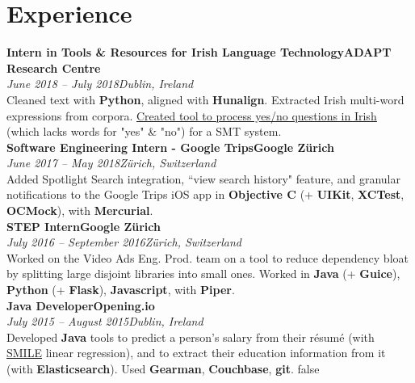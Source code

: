 \documentclass[a4paper, oneside, final]{scrartcl}
\newcommand{\nasc}[2]{\href{#1}{\color{blue}\setulcolor{blue}\ul{#2}}}
\newcommand{\bearna}[0]{\vspace{2.25mm}\\}
\newcommand{\fmtdate}[1]{\textit{#1}}
\newcommand{\fmtaddress}[1]{\textit{#1}}
\newcommand{\fmtjobtitle}[1]{\textbf{#1}}
\newcommand{\fmtskill}[1]{\textbf{#1}}
\begin{document}
\section{Experience}
\fmtjobtitle{Intern in Tools \& Resources for Irish Language Technology\hfill ADAPT Research Centre}\\
\fmtdate{June 2018 -- July 2018}\hfill\fmtaddress{Dublin, Ireland}\\
Cleaned text with \fmtskill{Python}, aligned with \fmtskill{Hunalign}. Extracted Irish multi-word expressions from corpora. \nasc{http://mycode.doesnot.run/2018/08/15/yes-no/}{Created tool to process yes/no questions in Irish} (which lacks words for "yes" \& "no") for a SMT system.
\bearna
\fmtjobtitle{Software Engineering Intern - Google Trips\hfill Google Zürich}\\
\fmtdate{June 2017 -- May 2018}\hfill\fmtaddress{Zürich, Switzerland}\\
Added Spotlight Search integration, ``view search history" feature, and granular notifications to the Google Trips iOS app in \fmtskill{Objective C} (+ \fmtskill{UIKit}, \fmtskill{XCTest}, \fmtskill{OCMock}), with \fmtskill{Mercurial}.
\bearna
\fmtjobtitle{STEP Intern\hfill Google Zürich}\\
\fmtdate{July 2016 -- September 2016}\hfill\fmtaddress{Zürich, Switzerland}\\
Worked on the Video Ads Eng. Prod. team on a tool to reduce dependency bloat by splitting large disjoint libraries into small ones. Worked in \fmtskill{Java} (+ \fmtskill{Guice}), \fmtskill{Python} (+ \fmtskill{Flask}), \fmtskill{Javascript}, with \fmtskill{Piper}.
\bearna
\fmtjobtitle{Java Developer\hfill Opening.io}\\
\fmtdate{July 2015 -- August 2015}\hfill\fmtaddress{Dublin, Ireland}\\
Developed \fmtskill{Java} tools to predict a person's salary from their résumé (with \nasc{https://github.com/haifengl/smile}{SMILE} linear regression), and to extract their education information from it (with \fmtskill{Elasticsearch}). Used \fmtskill{Gearman}, \fmtskill{Couchbase}, \fmtskill{git}.
\if false
\bearna
{}
\end{document}
